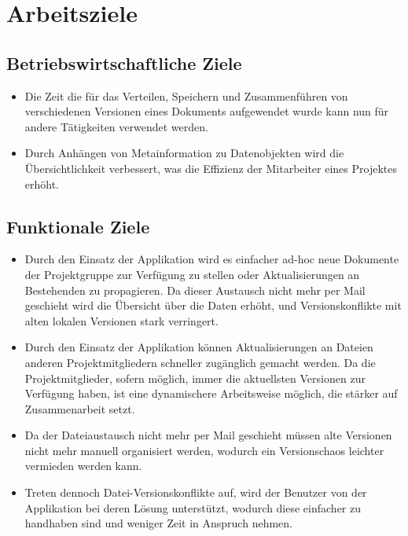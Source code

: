 
\section{Arbeitsziele}

\subsection{Betriebswirtschaftliche Ziele}
\begin{itemize}
\item Die Zeit die für das Verteilen, Speichern und Zusammenführen von verschiedenen Versionen eines Dokuments aufgewendet wurde kann nun für andere Tätigkeiten verwendet werden.
\item Durch Anhängen von Metainformation zu Datenobjekten wird die Übersichtlichkeit verbessert, was die Effizienz der Mitarbeiter eines Projektes erhöht.
\end{itemize}

\subsection{Funktionale Ziele}
\begin{itemize}
\item Durch den Einsatz der Applikation wird es einfacher ad-hoc neue Dokumente der Projektgruppe zur Verfügung zu stellen oder Aktualisierungen an Bestehenden zu propagieren. Da dieser Austausch nicht mehr per Mail geschieht wird die Übersicht über die Daten erhöht, und Versionskonflikte mit alten lokalen Versionen stark verringert.

\item Durch den Einsatz der Applikation können Aktualisierungen an Dateien anderen Projektmitgliedern schneller zugänglich gemacht werden. Da die Projektmitglieder, sofern möglich, immer die aktuellsten Versionen zur Verfügung haben, ist eine dynamischere Arbeitsweise möglich, die stärker auf Zusammenarbeit setzt.

\item Da der Dateiaustausch nicht mehr per Mail geschieht müssen alte Versionen nicht mehr manuell organisiert werden, wodurch ein Versionschaos leichter vermieden werden kann.

\item Treten dennoch Datei-Versionskonflikte auf, wird der Benutzer von der Applikation bei deren Lösung unterstützt, wodurch diese einfacher zu handhaben sind und weniger Zeit in Anspruch nehmen.

\end{itemize}

